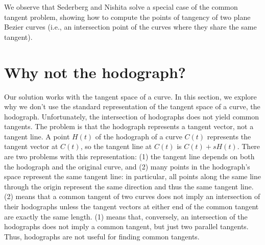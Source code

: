 \documentclass[10pt,twocolumn]{article}
\begin{document}
We observe that Sederberg and Nishita \cite{sederberg90} solve a special case of the common
tangent problem, showing how to compute the points of tangency of two plane Bezier curves
(i.e., an intersection point of the curves where they share the same tangent).

\section{Why not the hodograph?}
\label{sec:hodo}

Our solution works with the tangent space of a curve.
In this section, we explore why we don't use the standard representation of 
the tangent space of a curve, the hodograph.
Unfortunately, the intersection of hodographs does not yield common tangents.
The problem is that the hodograph represents a tangent vector, not a tangent line.
A point $H(t)$ of the hodograph of a curve $C(t)$ represents the tangent 
vector at $C(t)$, so the tangent line at $C(t)$ is $C(t) + sH(t)$.
There are two problems with this representation:
(1) the tangent line depends on both the hodograph and the original curve,
and
(2) many points in the hodograph's space represent the same tangent line:
    in particular, 
    all points along the same line through the origin represent the same
    direction and thus the same tangent line.
(2) means that a common tangent of two curves does not imply an intersection
of their hodographs unless the tangent vectors at either end of the common
tangent are exactly the same length.
(1) means that, conversely, an intersection of the hodographs does not
imply a common tangent, but just two parallel tangents.
Thus, hodographs are not useful for finding common tangents.

\end{document}
